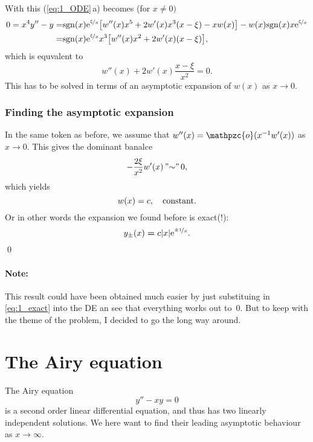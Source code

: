 \documentclass[11pt,letter, swedish, english
]{article}
\renewcommand{\thesubsubsection}{\arabic{section} (\alph{subsection},\,\roman{subsubsection})}
\newcommand{\oh}{\ensuremath\mathpzc{o}}
\begin{document}
With this (\ref{eq:1_ODE}\,a) becomes (for $x\neq0)$
\begin{equation}
\begin{aligned}
0=x^4y''-y=&\mathrm{sgn}\qty(x)\mathrm{e}^{\nicefrac{\xi}{x}}\qty[
w''(x)x^5 +2w'(x)x^3\qty(x-\xi) -xw(x)] - w(x)\mathrm{sgn}\qty(x)x\mathrm{e}^{\nicefrac{\xi}{x}}\\ 
=&\mathrm{sgn}\qty(x)\mathrm{e}^{\nicefrac{\xi}{x}} x^3\qty[
w''(x)x^2 +2w'(x)\qty(x-\xi)],
\end{aligned}
\end{equation}
which is equvalent to
\begin{equation}
w''(x) +2w'(x)\frac{x-\xi}{x^2}=0.
\end{equation}
This has to be solved in terms of an asymptotic expansion of $w(x)$
as $x\to0$.

\subsubsection{Finding the asymptotic expansion}
In the same token as before, we assume that $w''(x)=\oh(x^{-1}w'(x))$
as $x\to0$. This gives the dominant banalce 
\begin{equation}
-\frac{2\xi}{x^2}w'(x)\,"{\sim}"\,0,
\end{equation}
which yields
\begin{equation}
w(x)=c\qcomma \text{constant.}
\end{equation}
Or in other words the expansion we found before is exact(!):
\begin{equation}\label{eq:1_exact}
y_\pm(x) \boldsymbol{=} c\abs{x}\mathrm{e}^{\nicefrac{\pm1}{x}}.
\end{equation}
\qed

\paragraph{Note:}
This result could have been obtained much easier by just substituing
in \eqref{eq:1_exact} into the DE an see that everything works out
to~0. But to keep with the theme of the problem, I decided to go the
long way around. 


\section{The Airy equation}
\newcommand{\xtoi}{\ensuremath{x\to\infty}}
\newcommand{\ttoz}{\ensuremath{t\to0^+}}
\renewcommand{\thesubsubsection}{(\roman{subsubsection})}

The Airy equation
\begin{equation}\label{eq:Airy}
y''-xy=0
\end{equation}
is a second order linear differential equation, and thus has two
linearly independent solutions. We here want to find their leading
asymptotic behaviour as \xtoi. 
\end{document}
